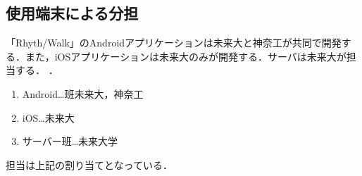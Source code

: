 \subsection{使用端末による分担}
\par
「Rhyth/Walk」のAndroidアプリケーションは未来大と神奈工が共同で開発する．また，iOSアプリケーションは未来大のみが開発する．サーバは未来大が担当する．
．
\begin{enumerate}
\item Android…班未来大，神奈工
\item iOS…未来大
\item サーバー班…未来大学
\end{enumerate}
\par
担当は上記の割り当てとなっている．
